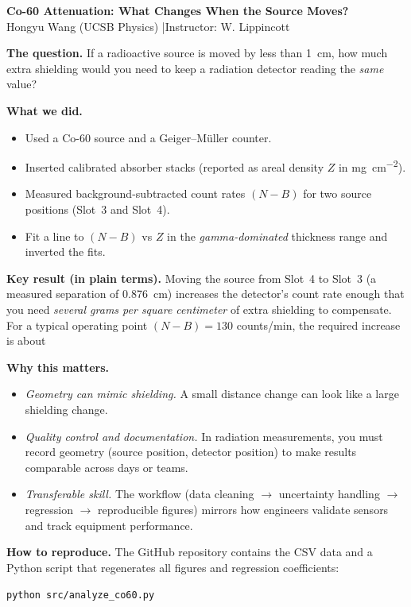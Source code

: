 \documentclass[11pt]{article}
\begin{document}
\begin{center}
{\LARGE \textbf{Co-60 Attenuation: What Changes When the Source Moves?}}\\[0.4em]
{\large Hongyu Wang (UCSB Physics) \quad|\quad Instructor: W. Lippincott}
\end{center}

\vspace{0.6em}
\textbf{The question.} If a radioactive source is moved by less than \SI{1}{cm}, how much extra shielding would you need to keep a radiation detector reading the \emph{same} value?

\vspace{0.6em}
\textbf{What we did.}
\begin{itemize}[leftmargin=*]
  \item Used a Co-60 source and a Geiger--M\"uller counter.
  \item Inserted calibrated absorber stacks (reported as areal density $Z$ in \si{mg.cm^{-2}}).
  \item Measured background-subtracted count rates $(N-B)$ for two source positions (Slot~3 and Slot~4).
  \item Fit a line to $(N-B)$ vs $Z$ in the \emph{gamma-dominated} thickness range and inverted the fits.
\end{itemize}

\textbf{Key result (in plain terms).}
Moving the source from Slot~4 to Slot~3 (a measured separation of \SI{0.876}{cm}) increases the detector's count rate enough that you need \emph{several grams per square centimeter} of extra shielding to compensate.
For a typical operating point $(N-B)=130$ counts/min, the required increase is about
\vspace{0.2em}
\begin{center}
\end{center}
\vspace{0.2em}

\textbf{Why this matters.}
\begin{itemize}[leftmargin=*]
  \item \emph{Geometry can mimic shielding.} A small distance change can look like a large shielding change.
  \item \emph{Quality control and documentation.} In radiation measurements, you must record geometry (source position, detector position) to make results comparable across days or teams.
  \item \emph{Transferable skill.} The workflow (data cleaning $\rightarrow$ uncertainty handling $\rightarrow$ regression $\rightarrow$ reproducible figures) mirrors how engineers validate sensors and track equipment performance.
\end{itemize}

\textbf{How to reproduce.} The GitHub repository contains the CSV data and a Python script that regenerates all figures and regression coefficients:
\begin{center}
\texttt{python src/analyze\_co60.py}
\end{center}
\end{document}
